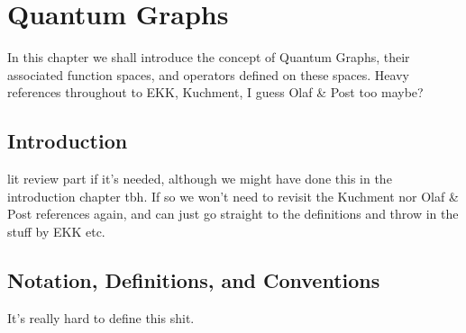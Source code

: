 \chapter{Quantum Graphs} \label{ch:QuantumGraphs}
In this chapter we shall introduce the concept of Quantum Graphs, their associated function spaces, and operators defined on these spaces.
Heavy references throughout to EKK, Kuchment, I guess Olaf \& Post too maybe?

\section{Introduction}
lit review part if it's needed, although we might have done this in the introduction chapter tbh.
If so we won't need to revisit the Kuchment nor Olaf \& Post references again, and can just go straight to the definitions and throw in the stuff by EKK etc.

\section{Notation, Definitions, and Conventions} \label{sec:QG-Notation}
It's really hard to define this shit.

